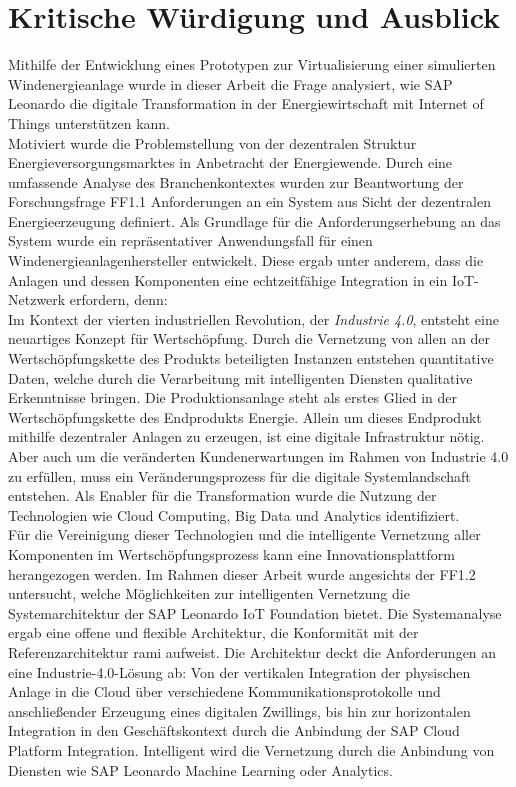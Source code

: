 \section{Kritische Würdigung und Ausblick}

Mithilfe der Entwicklung eines Prototypen zur Virtualisierung einer simulierten Windenergieanlage wurde in dieser Arbeit die Frage analysiert, wie SAP Leonardo die digitale Transformation in der Energiewirtschaft mit Internet of Things unterstützen kann. 
\\Motiviert wurde die Problemstellung von der dezentralen Struktur Energieversorgungsmarktes in Anbetracht der Energiewende. Durch eine umfassende Analyse des Branchenkontextes wurden zur Beantwortung der Forschungsfrage FF1.1 Anforderungen an ein System aus Sicht der dezentralen Energieerzeugung definiert. Als Grundlage für die Anforderungserhebung an das System wurde ein repräsentativer Anwendungsfall für einen Windenergieanlagenhersteller entwickelt. Diese ergab unter anderem, dass die Anlagen und dessen Komponenten eine echtzeitfähige Integration in ein IoT-Netzwerk erfordern, denn:
\\Im Kontext der vierten industriellen Revolution, der \textit{Industrie 4.0}, entsteht eine neuartiges Konzept für Wertschöpfung. Durch die Vernetzung von allen an der Wertschöpfungskette des Produkts beteiligten Instanzen entstehen quantitative Daten, welche durch die Verarbeitung mit intelligenten Diensten qualitative Erkenntnisse bringen. Die Produktionsanlage steht als erstes Glied in der Wertschöpfungskette des Endprodukts Energie. Allein um dieses Endprodukt mithilfe dezentraler Anlagen zu erzeugen, ist eine digitale Infrastruktur nötig. Aber auch um die veränderten Kundenerwartungen im Rahmen von Industrie 4.0 zu erfüllen, muss ein Veränderungsprozess für die digitale Systemlandschaft entstehen. Als Enabler für die Transformation wurde die Nutzung der Technologien wie Cloud Computing, Big Data und Analytics identifiziert. 
\\Für die Vereinigung dieser Technologien und die intelligente Vernetzung aller Komponenten im Wertschöpfungsprozess kann eine Innovationsplattform herangezogen werden. Im Rahmen dieser Arbeit wurde angesichts der FF1.2 untersucht, welche Möglichkeiten zur intelligenten Vernetzung die Systemarchitektur der SAP Leonardo IoT Foundation bietet. Die Systemanalyse ergab eine offene und flexible Architektur, die Konformität mit der Referenzarchitektur \ac{rami} aufweist. Die Architektur deckt die Anforderungen an eine Industrie-4.0-Lösung ab: Von der vertikalen Integration der physischen Anlage in die Cloud über verschiedene Kommunikationsprotokolle und anschließender Erzeugung eines digitalen Zwillings, bis hin zur horizontalen Integration in den Geschäftskontext durch die Anbindung der SAP Cloud Platform Integration. Intelligent wird die Vernetzung durch die Anbindung von Diensten wie SAP Leonardo Machine Learning oder Analytics. 

